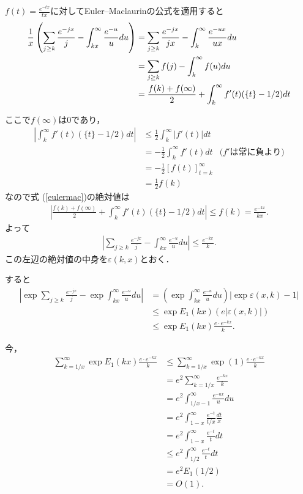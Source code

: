 \documentclass{jsarticle}
\theoremstyle{definition}
\begin{document}
$f(t) = \frac{e^{-tx}}{tx}$に対してEuler--Maclaurinの公式を適用すると
\begin{align}
\frac{1}{x} \left(
\sum_{j \ge k} \frac{e^{-jx}}{j}
- \int_{kx}^\infty \frac{e^{-u}}{u} du
\right)
&= \sum_{j \ge k} \frac{e^{-jx}}{jx}
- \int_{k}^\infty \frac{e^{-ux}}{ux} du  \notag \\
& = \sum_{j \ge k} f(j)
- \int_{k}^\infty f(u) du  \notag \\
& = \frac{f(k)+f(\infty)}{2} + \int_k^\infty f'(t) (\{t\} - 1/2) dt \label{eulermac}
\end{align}

ここで$f(\infty)$は$0$であり，
\begin{align*}
\left| \int_k^\infty f'(t) (\{t\} - 1/2) dt \right|
&\le \frac{1}{2} \int_k^\infty |f'(t)| dt \\
&= - \frac{1}{2} \int_k^\infty f'(t) dt & \text{($f'$は常に負より)} \\
&= - \frac{1}{2} [f(t)]_{t=k}^\infty \\
&= \frac{1}{2} f(k)
\end{align*}
なので式 (\ref{eulermac})の絶対値は
\begin{align*}
\left|
\frac{f(k)+f(\infty)}{2} + \int_k^\infty f'(t) (\{t\} - 1/2) dt
\right| \le f(k) = \frac{e^{-k x}}{k x}.
\end{align*}
よって
\begin{align*}
\left|
\sum_{j \ge k} \frac{e^{-jx}}{j}
- \int_{kx}^\infty \frac{e^{-u}}{u} du
\right| \le \frac{e^{-k x}}{k}.
\end{align*}
この左辺の絶対値の中身を$\varepsilon(k, x)$とおく．

すると
\begin{align*}
\left|\exp \sum_{j \ge k} \frac{e^{-jx}}{j}
- \exp \int_{kx}^\infty \frac{e^{-u}}{u} du\right|
&= \left(\exp \int_{kx}^\infty \frac{e^{-u}}{u} du\right) |\exp \varepsilon(x, k) - 1| \\
&\le \exp E_1(k x) (e |\varepsilon(x, k)|) \\
&\le \exp E_1(k x) \frac{e \cdot e^{-k x}}{k}.
\end{align*}

今，
\begin{align*}
\sum_{k=1/x}^\infty \exp E_1(k x) \frac{e \cdot e^{-k x}}{k}
&\le \sum_{k=1/x}^\infty \exp (1) \frac{e \cdot e^{-k x}}{k} \\
&= e^2 \sum_{k=1/x}^\infty \frac{e^{-k x}}{k} \\
&= e^2 \int_{1/x-1}^\infty \frac{e^{-u x}}{u} du \\
&= e^2 \int_{1-x}^\infty \frac{e^{-t}}{t/x} \frac{dt}{x} \\
&= e^2 \int_{1-x}^\infty \frac{e^{-t}}{t} dt \\
&\le e^2 \int_{1/2}^\infty \frac{e^{-t}}{t} dt \\
&= e^2 E_1(1/2) \\
&= O(1).
\end{align*}
\end{document}

